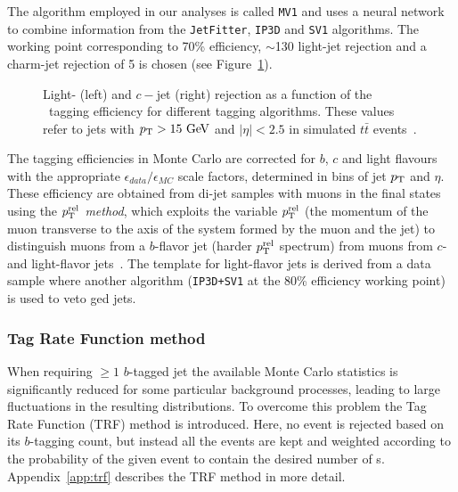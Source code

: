 The algorithm employed in our analyses is called \texttt{MV1} and uses
a neural network to combine information from the \texttt{JetFitter}, \texttt{IP3D}
and \texttt{SV1} algorithms.
The working point corresponding to 70\% efficiency, 
$\sim$130 light-jet rejection and a charm-jet rejection of 5 is 
chosen (see Figure~\ref{fig:btageffs}).

\begin{figure}[tb]\begin{center}
	\caption{Light- (left) and $c-$jet (right) rejection as a function of the \bjet\ tagging efficiency
        for different tagging algorithms. These values refer to jets with $\pt >15\gev$ and 
$|\eta|<2.5$ in simulated $t\bar{t}$ events~\cite{btagging}.\label{fig:btageffs}}
\end{center}\end{figure}

The tagging efficiencies in Monte Carlo are corrected for $b$, $c$ and light flavours
with the appropriate $\epsilon_{data}/\epsilon_{MC}$ scale factors,
determined in bins of jet $\pt$ and $\eta$.
These efficiency are obtained from di-jet samples with
muons in the final states using the {\it  $\pt^{\rm rel}$ method},
which exploits the variable $\pt^{\rm rel}$ (the momentum of the
muon transverse to the axis of the system formed by the muon and the jet)
to distinguish muons from a $b$-flavor jet (harder  $\pt^{\rm rel}$ spectrum)
from muons from $c$- and light-flavor jets~\cite{btagging,ctagging,ltagging}. 
The template for light-flavor jets is derived from a data sample
where another algorithm (\texttt{IP3D+SV1} at the 80\% efficiency working point) 
is used to veto \btag ged jets.


\myskip
\tocless\subsubsection{Tag Rate Function method}\label{sec:trf}
When requiring $\geq 1$ $b$-tagged jet the
available Monte Carlo statistics is significantly reduced for 
some particular background processes, leading to large
fluctuations in the resulting distributions.
To overcome this problem the Tag Rate Function (TRF) method is introduced.
Here, no event is rejected based on its $b$-tagging count, 
but instead all the events are 
kept and weighted according to the
probability of the given event to contain the desired number of \bjet s.
Appendix~\ref{app:trf} describes the TRF method in more detail.

